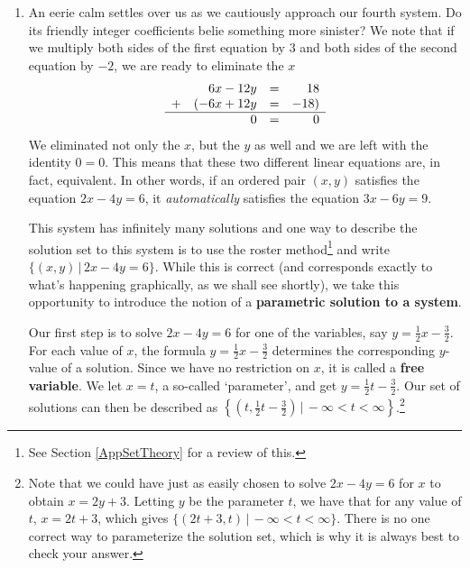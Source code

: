 \documentclass{ximera}
\begin{document}
\begin{example}
\begin{explanation}
\begin{enumerate}
\begin{center}
\end{center}

\item  An eerie calm settles over us as we cautiously approach our fourth system.  Do its friendly integer coefficients belie something more sinister?  We note that if we multiply both sides of the first equation by $3$ and both sides of the second equation by $-2$, we are ready to eliminate the $x$ \[ \begin{array}{lrcr} & 6x-12y & = & 18  \\ + & (-6x+12y  & = & -18 ) \\ \hline  & 0 & = & 0\end{array}\] We eliminated not only the $x$, but the $y$ as well and we are left with the identity $0=0$.  This means that these two different linear equations are, in fact, equivalent.  In other words, if an ordered pair $(x,y)$ satisfies the equation $2x-4y = 6$, it \textit{automatically} satisfies the equation $3x-6y = 9$.  


This system has infinitely many solutions and one way to describe the solution set to this system is to use the roster method\footnote{See Section \ref{AppSetTheory} for a review of this.} and write $\{(x,y) \, | \, 2x-4y = 6\}$.  While this is correct (and corresponds exactly to what's happening graphically, as we shall see shortly), we take this opportunity to introduce the notion of a  \textbf{parametric solution to a system}.  

Our first step is to solve $2x-4y = 6$ for one of the variables, say $y = \frac{1}{2} x - \frac{3}{2}$.  For each value of $x$, the formula $y = \frac{1}{2} x - \frac{3}{2}$ determines the corresponding $y$-value of a solution.  Since we have no restriction on $x$, it is called a \textbf{free variable}.  We let $x=t$, a so-called `parameter', and get $y = \frac{1}{2} t - \frac{3}{2}$. Our set of solutions can then be described as $\left\{ \left(t, \frac{1}{2} t - \frac{3}{2}\right) \, | \, -\infty < t < \infty \right\}$.\footnote{Note that we could have just as easily chosen to solve $2x-4y = 6$ for $x$ to obtain $x = 2y + 3$.  Letting $y$ be the parameter $t$, we have that for any value of $t$, $x = 2t+3$, which gives $\{(2t+3, t) \, | \, - \infty < t < \infty\}$.  There is no one correct way to parameterize the solution set, which is why it is always best to check your answer.}  


\end{enumerate}
\end{explanation}
\end{example}
\end{document}
